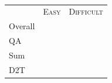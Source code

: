 \begin{table}[!ht]
\renewcommand{\arraystretch}{1.5}

\small
\centering
    \begin{tabular}{lcc}
    \toprule
     & \multicolumn{1}{c}{\textsc{Easy}} & \multicolumn{1}{c}{\textsc{Difficult}} \\
    Overall \\
    QA \\
    Sum \\ 
    D2T \\



    \bottomrule
    \end{tabular}
    \caption{}
    \label{tab:3-statistic}
\end{table}
